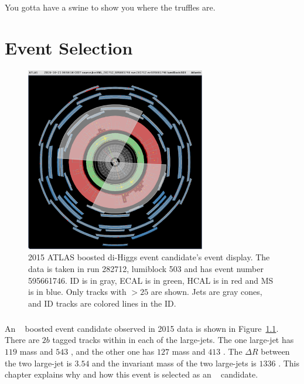 \begin{savequote}[75mm]
You gotta have a swine to show you where the truffles are.
\end{savequote}

\chapter{Event Selection}
\label{sec:selection}

\begin{figure}[htb!]
  \centering
  \includegraphics[width=0.7\textwidth]{figures/theory/JiveXML_282712_595661746-YX-2018-04-16-20-50-34}
  \caption{2015 ATLAS boosted di-Higgs event candidate's event display. The data is taken in run 282712, lumiblock 503 and has event number 595661746. ID is in gray, ECAL is in green, HCAL is in red and MS is in blue. Only tracks with \pt $>25$ \GeV are shown. Jets are gray cones, and ID tracks are colored lines in the ID.}
  \label{fig:event_display}
\end{figure}

\paragraph{}
An \Xtohhb~ boosted event candidate observed in 2015 data is shown in Figure~\ref{fig:event_display}. 
There are $2b$ tagged tracks within in each of the large-\R jets. 
The one large-\R jet has $119$ \GeV mass and $543$ \GeV \pt, and the other one has $127$ \GeV mass and $413$ \GeV \pt. 
The $\Delta R$ between the two large-\R jet is $3.54$ and the invariant mass of the two large-\R jets is $1336$ \GeV.
This chapter explains why and how this event is selected as an \Xtohhb~ candidate.

